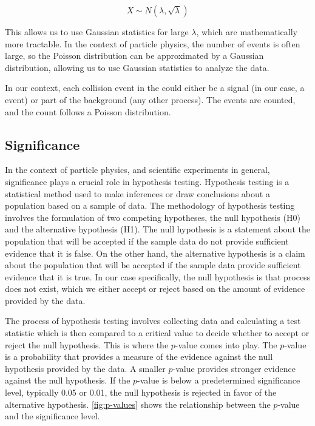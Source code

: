 \begin{equation}
    X \sim N(\lambda, \sqrt{\lambda})
\end{equation}

This allows us to use Gaussian statistics for large $\lambda$, which are mathematically more tractable. In the context
of particle physics, the number of events is often large, so the Poisson distribution can be approximated by a Gaussian
distribution, allowing us to use Gaussian statistics to analyze the data.

In our context, each collision event in the \tth could either be a signal (in our case, a \tth event) or part of the
background (any other process). The events are counted, and the count follows a Poisson distribution.

\subsection{Significance}

In the context of particle physics, and scientific experiments in general, significance plays a crucial role in
hypothesis testing. Hypothesis testing is a statistical method used to make inferences or draw conclusions about a
population based on a sample of data. The methodology of hypothesis testing involves the formulation of two competing
hypotheses, the null hypothesis (H0) and the alternative hypothesis (H1). The null hypothesis is a statement about the
population that will be accepted if the sample data do not provide sufficient evidence that it is false. On the other
hand, the alternative hypothesis is a claim about the population that will be accepted if the sample data provide
sufficient evidence that it is true. In our case specifically, the null hypothesis is that \tth process does not exist,
which we either accept or reject based on the amount of evidence provided by the data.

The process of hypothesis testing involves collecting data and calculating a test statistic which is then compared to a
critical value to decide whether to accept or reject the null hypothesis. This is where the $p$-value comes into
play. The $p$-value is a probability that provides a measure of the evidence against the null hypothesis provided by the
data. A smaller $p$-value provides stronger evidence against the null hypothesis. If the $p$-value is below a
predetermined significance level, typically 0.05 or 0.01, the null hypothesis is rejected in favor of the alternative
hypothesis. \autoref{fig:p-values} shows the relationship between the $p$-value and the significance level.

